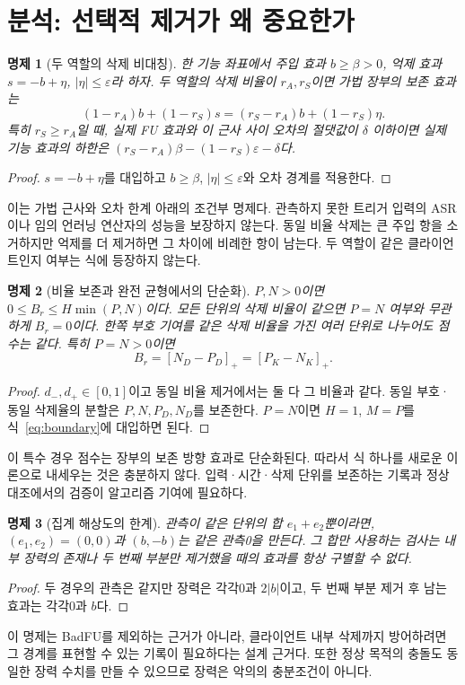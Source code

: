\documentclass[10pt,a4paper]{article}
\newtheorem{proposition}{명제}
\begin{document}
\section{분석: 선택적 제거가 왜 중요한가}
\begin{proposition}[두 역할의 삭제 비대칭]
한 기능 좌표에서 주입 효과 $b\ge\beta>0$, 억제 효과 $s=-b+\eta$, $|\eta|\le\varepsilon$라 하자.
두 역할의 삭제 비율이 $r_A,r_S$이면 가법 장부의 보존 효과는
\begin{equation}\label{eq:asymmetry}
 (1-r_A)b+(1-r_S)s=(r_S-r_A)b+(1-r_S)\eta.
\end{equation}
특히 $r_S\ge r_A$일 때, 실제 FU 효과와 이 근사 사이 오차의 절댓값이 $\delta$ 이하이면
실제 기능 효과의 하한은 $(r_S-r_A)\beta-(1-r_S)\varepsilon-\delta$다.
\end{proposition}
\begin{proof}
$s=-b+\eta$를 대입하고 $b\ge\beta$, $|\eta|\le\varepsilon$와 오차 경계를 적용한다.
\end{proof}
이는 가법 근사와 오차 한계 아래의 조건부 명제다.
관측하지 못한 트리거 입력의 ASR이나 임의 언러닝 연산자의 성능을 보장하지 않는다.
동일 비율 삭제는 큰 주입 항을 소거하지만 억제를 더 제거하면 그 차이에 비례한 항이 남는다.
두 역할이 같은 클라이언트인지 여부는 식에 등장하지 않는다.

\begin{proposition}[비율 보존과 완전 균형에서의 단순화]
$P,N>0$이면 $0\le B_r\le H\min(P,N)$이다.
모든 단위의 삭제 비율이 같으면 $P=N$ 여부와 무관하게 $B_r=0$이다.
한쪽 부호 기여를 같은 삭제 비율을 가진 여러 단위로 나누어도 점수는 같다.
특히 $P=N>0$이면
\begin{equation}
 B_r=[N_D-P_D]_+=[P_K-N_K]_+.
\end{equation}
\end{proposition}
\begin{proof}
$d_-,d_+\in[0,1]$이고 동일 비율 제거에서는 둘 다 그 비율과 같다.
동일 부호·동일 삭제율의 분할은 $P,N,P_D,N_D$를 보존한다.
$P=N$이면 $H=1$, $M=P$를 식~\eqref{eq:boundary}에 대입하면 된다.
\end{proof}
이 특수 경우 점수는 장부의 보존 방향 효과로 단순화된다.
따라서 식 하나를 새로운 이론으로 내세우는 것은 충분하지 않다.
입력·시간·삭제 단위를 보존하는 기록과 정상 대조에서의 검증이 알고리즘 기여에 필요하다.

\begin{proposition}[집계 해상도의 한계]
관측이 같은 단위의 합 $e_1+e_2$뿐이라면,
$(e_1,e_2)=(0,0)$과 $(b,-b)$는 같은 관측0을 만든다.
그 합만 사용하는 검사는 내부 장력의 존재나 두 번째 부분만 제거했을 때의 효과를 항상 구별할 수 없다.
\end{proposition}
\begin{proof}
두 경우의 관측은 같지만 장력은 각각0과 $2|b|$이고, 두 번째 부분 제거 후 남는 효과는 각각0과 $b$다.
\end{proof}
이 명제는 BadFU를 제외하는 근거가 아니라, 클라이언트 내부 삭제까지 방어하려면
그 경계를 표현할 수 있는 기록이 필요하다는 설계 근거다.
또한 정상 목적의 충돌도 동일한 장력 수치를 만들 수 있으므로 장력은 악의의 충분조건이 아니다.
\end{document}
